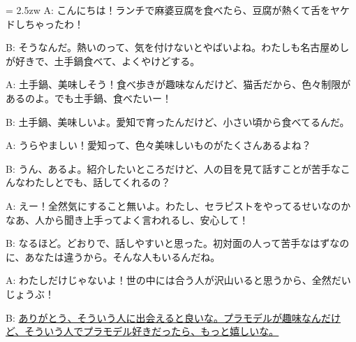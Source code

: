 \documentclass[11pt]{amsart}
\title{}
\author{}
\newenvironment{hangall}[1]{\hangindent = 2.5zw\everypar{\hangindent = 2.5zw}}{}
\begin{document}
\maketitle
\begin{hangall}{}%
A: こんにちは！ランチで麻婆豆腐を食べたら、豆腐が熱くて舌をヤケドしちゃったわ！

B: そうなんだ。熱いのって、気を付けないとやばいよね。わたしも名古屋めしが好きで、土手鍋食べて、よくやけどする。

A: 土手鍋、美味しそう！食べ歩きが趣味なんだけど、猫舌だから、色々制限があるのよ。でも土手鍋、食べたいー！

B: 土手鍋、美味しいよ。愛知で育ったんだけど、小さい頃から食べてるんだ。

A: うらやましい！愛知って、色々美味しいものがたくさんあるよね？

B: うん、あるよ。紹介したいところだけど、人の目を見て話すことが苦手なこんなわたしとでも、話してくれるの？

A: えー！全然気にすること無いよ。わたし、セラピストをやってるせいなのかなあ、人から聞き上手ってよく言われるし、安心して！

B: なるほど。どおりで、話しやすいと思った。初対面の人って苦手なはずなのに、あなたは違うから。そんな人もいるんだね。

A: わたしだけじゃないよ！世の中には合う人が沢山いると思うから、全然だいじょうぶ！

B: \ul{ありがとう、そういう人に出会えると良いな。プラモデルが趣味なんだけど、そういう人でプラモデル好きだったら、もっと嬉しいな。}\end{hangall}
\end{document}
